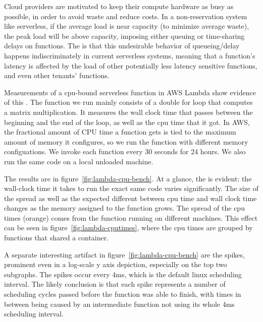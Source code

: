 Cloud providers are motivated to keep their compute hardware as busy as
possible, in order to avoid waste and reduce costs. In a non-reservation system
like serverless, if the average load is near capacity (to minimize average
waste), the peak load will be above capacity, imposing either queuing or
time-sharing delays on functions. The \problem{} is that this undesirable
behavior of queueing/delay happens indiscriminately in current serverless
systems, meaning that a function's latency is affected by the load of other
potentially less latency sensitive functions, and even other tenants' functions.

Measurements of a cpu-bound serverless function in AWS Lambda show evidence of
this \problem{}. The function we run mainly consists of a double for loop that
computes a matrix multiplication. It measures the wall clock time that passes
between the beginning and the end of the loop, as well as the cpu time that it
got. In AWS, the fractional amount of CPU time a function gets is tied to the
maximum amount of memory it configures, so we run the function with different
memory configuations. We invoke each function every 30 seconds for 24 hours. We
also run the same code on a local unloaded machine.

The results are in figure~\ref{fig:lambda-cpu-bench}. At a glance, the
\problem{} is evident: the wall-clock time it takes to run the exact same code
varies significantly. The size of the spread as well as the expected different
between cpu time and wall clock time changes as the memory assigned to the
function grows. The spread of the cpu times (orange) comes from the function
running on different machines. This effect can be seen in
figure~\ref{fig:lambda-cputimes}, where the cpu times are grouped by functions
that shared a container.

A separate interesting artifact in figure~\ref{fig:lambda-cpu-bench} are the
spikes, prominent even in a log-scale y axis depiction, especially on the top
two subgraphs. The spikes occur every 4ms, which is the default linux scheduling
interval. The likely conclusion is that each spike represents a number of
scheduling cycles passed before the function was able to finish, with times in
between being caused by an intermediate function not using its whole 4ms
scheduling interval.


